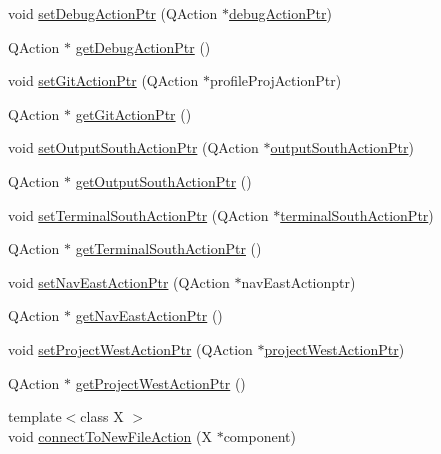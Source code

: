\begin{DoxyCompactItemize}
\item 
void \hyperlink{class_master_actions_a66be4fac5aa53c8c40128e1cfab35676}{set\-Debug\-Action\-Ptr} (Q\-Action $\ast$\hyperlink{class_master_actions_ae37993bbbed4a238ea3b11089ac46a61}{debug\-Action\-Ptr})
\item 
Q\-Action $\ast$ \hyperlink{class_master_actions_a38c19285a782f80fd538243f1a7119bc}{get\-Debug\-Action\-Ptr} ()
\item 
void \hyperlink{class_master_actions_a785e8465b91e563926ab0ef021907128}{set\-Git\-Action\-Ptr} (Q\-Action $\ast$profile\-Proj\-Action\-Ptr)
\item 
Q\-Action $\ast$ \hyperlink{class_master_actions_a512f6344322707bd745ac413036238df}{get\-Git\-Action\-Ptr} ()
\item 
void \hyperlink{class_master_actions_ac476afca80285f13a11ef0e5cd10778c}{set\-Output\-South\-Action\-Ptr} (Q\-Action $\ast$\hyperlink{class_master_actions_a5b7a85c6728274eb0fcb48924044b9f6}{output\-South\-Action\-Ptr})
\item 
Q\-Action $\ast$ \hyperlink{class_master_actions_acb9a1d3eb98cab06fd2ae5b9faf30fc3}{get\-Output\-South\-Action\-Ptr} ()
\item 
void \hyperlink{class_master_actions_a718fd78374dab2c701fef75aa9e7a2fe}{set\-Terminal\-South\-Action\-Ptr} (Q\-Action $\ast$\hyperlink{class_master_actions_ad96c9f17230e162e9a9f39a867101a53}{terminal\-South\-Action\-Ptr})
\item 
Q\-Action $\ast$ \hyperlink{class_master_actions_ae9a9fe05579b18051c29f7e54d50a06b}{get\-Terminal\-South\-Action\-Ptr} ()
\item 
void \hyperlink{class_master_actions_a42342f8666f61fd111f2cba1fd082d49}{set\-Nav\-East\-Action\-Ptr} (Q\-Action $\ast$nav\-East\-Actionptr)
\item 
Q\-Action $\ast$ \hyperlink{class_master_actions_af74c6ae5449f5f738eff1575defbde16}{get\-Nav\-East\-Action\-Ptr} ()
\item 
void \hyperlink{class_master_actions_ad0522fc89be3dd4451d84300208b5925}{set\-Project\-West\-Action\-Ptr} (Q\-Action $\ast$\hyperlink{class_master_actions_aa4160469d2e9a840448c49e95bcfa9e5}{project\-West\-Action\-Ptr})
\item 
Q\-Action $\ast$ \hyperlink{class_master_actions_a97e9c1a3bd46f70d1afd640ac06cc18d}{get\-Project\-West\-Action\-Ptr} ()
\item 
{\footnotesize template$<$class X $>$ }\\void \hyperlink{class_master_actions_a24f67a69e013feac51a24a34d32f2c40}{connect\-To\-New\-File\-Action} (X $\ast$component)

\end{DoxyCompactItemize}
